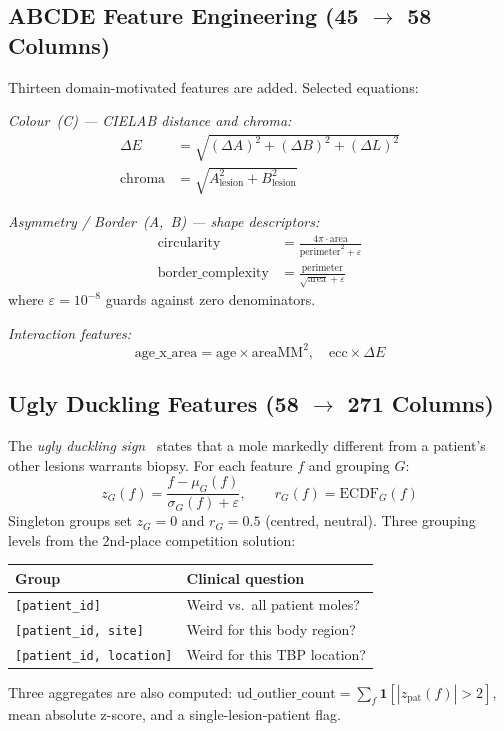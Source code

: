 \documentclass[conference]{IEEEtran}
\begin{document}
\subsection{ABCDE Feature Engineering (45 $\to$ 58 Columns)}

Thirteen domain-motivated features are added. Selected equations:

\textit{Colour~(C) --- CIELAB distance and chroma:}
\begin{align}
  \Delta E &= \sqrt{(\Delta A)^2 + (\Delta B)^2 + (\Delta L)^2}
  \label{eq:deltae}\\
  \text{chroma} &= \sqrt{A_{\text{lesion}}^2 + B_{\text{lesion}}^2}
  \label{eq:chroma}
\end{align}

\textit{Asymmetry / Border~(A,~B) --- shape descriptors:}
\begin{align}
  \text{circularity} &= \frac{4\pi\cdot\text{area}}
    {\text{perimeter}^2 + \varepsilon}
  \label{eq:circ}\\
  \text{border\_complexity} &= \frac{\text{perimeter}}
    {\sqrt{\text{area}} + \varepsilon}
  \label{eq:border}
\end{align}
where $\varepsilon = 10^{-8}$ guards against zero denominators.

\textit{Interaction features:}
\[
  \text{age\_x\_area} = \text{age} \times \text{areaMM}^2,
  \quad
  \text{ecc} \times \Delta E
\]

\subsection{Ugly Duckling Features (58 $\to$ 271 Columns)}

The \emph{ugly duckling sign}~\cite{grob1998ugly} states that a mole
markedly different from a patient's other lesions warrants biopsy.
For each feature $f$ and grouping $G$:
\begin{equation}
  z_{G}(f) = \frac{f - \mu_{G}(f)}{\sigma_{G}(f) + \varepsilon},
  \qquad
  r_{G}(f) = \text{ECDF}_{G}(f)
  \label{eq:ud}
\end{equation}
Singleton groups set $z_G = 0$ and $r_G = 0.5$ (centred, neutral).
Three grouping levels from the 2nd-place competition solution:
\begin{center}
\small
\begin{tabular}{lp{3.5cm}}
  \toprule
  \textbf{Group} & \textbf{Clinical question} \\
  \midrule
  \texttt{[patient\_id]} & Weird vs.\ all patient moles? \\
  \texttt{[patient\_id, site]} & Weird for this body region? \\
  \texttt{[patient\_id, location]} & Weird for this TBP location? \\
  \bottomrule
\end{tabular}
\end{center}
Three aggregates are also computed: $\text{ud\_outlier\_count} =
\sum_f\mathbf{1}[|z_\text{pat}(f)|>2]$, mean absolute z-score,
and a single-lesion-patient flag.
\end{document}
